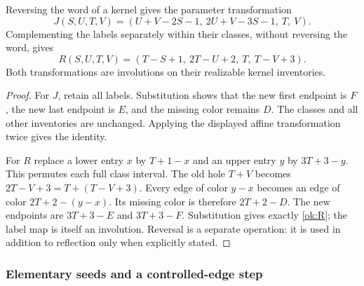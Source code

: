 \begin{lemma}\label{ok:reversal}
\label{ok:reflection}
Reversing the word of a kernel gives the parameter transformation
\[
 J(S,U,T,V)=(U+V-2S-1,\ 2U+V-3S-1,\ T,\ V).
 \tag{J}
 \label{ok:J}
 \]
Complementing the labels separately within their classes, without
reversing the word, gives
\[
 R(S,U,T,V)=(T-S+1,\ 2T-U+2,\ T,\ T-V+3).
 \tag{R}
 \label{ok:R}
 \]
Both transformations are involutions on their realizable kernel
inventories.
\end{lemma}
\begin{proof}
For $J$, retain all labels. Substitution shows that the new first
endpoint is $F$, the new last endpoint is $E$, and the missing color
remains $D$. The classes and all other inventories are unchanged.
Applying the displayed affine transformation twice gives the identity.

For $R$ replace a lower entry $x$ by $T+1-x$ and an upper entry
$y$ by $3T+3-y$. This permutes each full class interval. The old
hole $T+V$ becomes $2T-V+3=T+(T-V+3)$. Every edge of color
$y-x$ becomes an edge of color $2T+2-(y-x)$. Its missing color is
therefore $2T+2-D$. The new endpoints are $3T+3-E$ and $3T+3-F$.
Substitution gives exactly \eqref{ok:R}; the label map is itself an
involution. Reversal is a separate operation: it is used in addition
to reflection only when explicitly stated.
\end{proof}

\subsubsection{Elementary seeds and a controlled-edge step}

